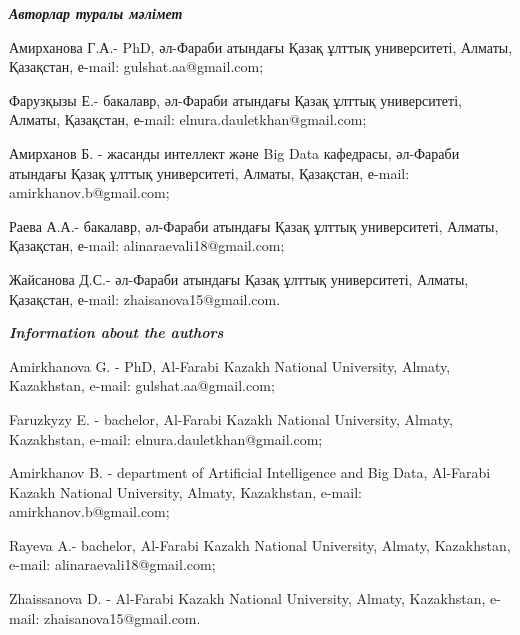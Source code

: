 \begin{info}
\hspace{1em}\emph{{\bfseries Авторлар туралы мәлімет}}

Амирханова Г.А.- PhD, әл-Фараби атындағы Қазақ ұлттық университеті,
Алматы, Қазақстан, е-mail: gulshat.aa@gmail.com;

Фарузқызы Е.- бакалавр, әл-Фараби атындағы Қазақ ұлттық университеті,
Алматы, Қазақстан, е-mail: elnura.dauletkhan@gmail.com;

Амирханов Б. - жасанды интеллект және Big Data кафедрасы, әл-Фараби
атындағы Қазақ ұлттық университеті, Алматы, Қазақстан, е-mail:
amirkhanov.b@gmail.com;

Раева А.А.- бакалавр, әл-Фараби атындағы Қазақ ұлттық университеті,
Алматы, Қазақстан, е-mail: alinaraevali18@gmail.com;

Жайсанова Д.С.- әл-Фараби атындағы Қазақ ұлттық университеті, Алматы,
Қазақстан, е-mail: zhaisanova15@gmail.com.

\hspace{1em}\emph{{\bfseries Information about the authors}}

Amirkhanova G. - PhD, Al-Farabi Kazakh National University, Almaty,
Kazakhstan, e-mail: gulshat.aa@gmail.com;

Faruzkyzy E. - bachelor, Al-Farabi Kazakh National University, Almaty,
Kazakhstan, e-mail: elnura.dauletkhan@gmail.com;

Amirkhanov B. - department of Artificial Intelligence and Big Data,
Al-Farabi Kazakh National University, Almaty, Kazakhstan, e-mail:
amirkhanov.b@gmail.com;

Rayeva A.- bachelor, Al-Farabi Kazakh National University, Almaty,
Kazakhstan, e-mail: alinaraevali18@gmail.com;

Zhaissanova D. - Al-Farabi Kazakh National University, Almaty,
Kazakhstan, e-mail: zhaisanova15@gmail.com.
\end{info}
